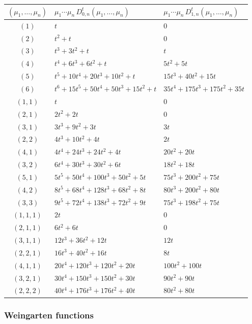 \documentclass[a4paper]{article}
\theoremstyle{plain}
\numberwithin{theorem}{section}
\theoremstyle{definition}
\theoremstyle{remark}
\begin{document}
\begin{center}
\begin{tabularx}{\textwidth}{cXX} \toprule
$(\mu_1, \ldots, \mu_n)$ & $\mu_1 \cdots \mu_n \, D_{0,n}^t(\mu_1, \ldots, \mu_n)$ & $\mu_1 \cdots \mu_n \, D_{1,n}^t(\mu_1, \ldots, \mu_n)$ \\ \midrule
$(1)$ & $t$ & $0$ \\
$(2)$ & $t^2 + t$ & $0$ \\
$(3)$ & $t^3 + 3t^2 + t$ & $t$ \\
$(4)$ & $t^4 + 6t^3 + 6t^2 + t$ & $5t^2 + 5t$ \\
$(5)$ & $t^5 + 10t^4 + 20t^3 + 10t^2 + t$ & $15t^3 + 40t^2 + 15t$ \\
$(6)$ & $t^6 + 15t^5 + 50t^4 + 50t^3 + 15t^2 + t$ & $35t^4 + 175t^3 + 175t^2 + 35t$ \\ \midrule
$(1,1)$ & $t$ & $0$ \\
$(2,1)$ & $2t^2 + 2t$ & $0$ \\
$(3,1)$ & $3t^3 + 9t^2 + 3t$ & $3t$ \\
$(2,2)$ & $4t^3 + 10t^2 + 4t$ & $2t$ \\
$(4,1)$ & $4t^4 + 24t^3 + 24t^2 + 4t$ & $20t^2 + 20t$ \\
$(3,2)$ & $6t^4 + 30t^3 + 30t^2 + 6t$ & $18t^2 + 18t$ \\
$(5,1)$ & $5t^5 + 50t^4 + 100t^3 + 50t^2 + 5t$ & $75t^3 + 200t^2 + 75t$ \\
$(4,2)$ & $8t^5 + 68t^4 + 128t^3 + 68t^2 + 8t$ & $80t^3 + 200t^2 + 80t$ \\
$(3,3)$ & $9t^5 + 72t^4 + 138t^3 + 72t^2 + 9t$ & $75t^3 + 198t^2 + 75t$ \\ \midrule
$(1,1,1)$ & $2t$ & $0$ \\
$(2,1,1)$ & $6t^2 + 6t$ & $0$ \\
$(3,1,1)$ & $12t^3 + 36t^2 + 12t$ & $12t$ \\
$(2,2,1)$ & $16t^3 + 40t^2 + 16t$ & $8t$ \\
$(4,1,1)$ & $20t^4 + 120t^3 + 120t^2 + 20t$ & $100t^2 + 100t$ \\
$(3,2,1)$ & $30t^4 + 150t^3 + 150t^2 + 30t$ & $90t^2 + 90t$ \\
$(2,2,2)$ & $40t^4 + 176t^3 + 176t^2 + 40t$ & $80t^2 + 80t$ \\ \bottomrule
\end{tabularx}
\end{center}



\subsubsection*{Weingarten functions}
\end{document}
